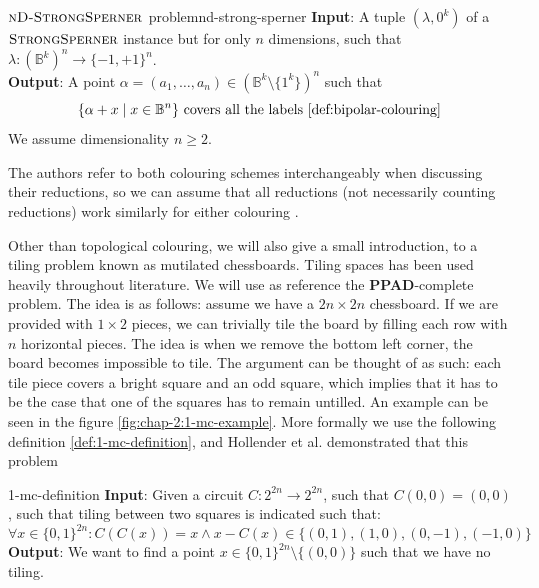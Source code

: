 \begin{definitionbox}{$\textnormal{\textsc{nD-StrongSperner}}$ problem}{nd-strong-sperner}
    \textbf{Input}: A tuple $(\lambda,0^k)$ of a $\textnormal{\textsc{StrongSperner}}$ instance but for only $n$ dimensions, such that
    $\lambda : (\mathbb{B}^k)^n \to \{-1, +1\}^n$.\\
    \textbf{Output}: A point $\alpha = (a_1, \hdots, a_n) \in (\mathbb{B}^k \setminus \{1^k\})^n$ such that
    $$
        \{\alpha + x \mid x \in \mathbb{B}^n\} \text{ covers all the labels \ref{def:bipolar-colouring}}
    $$
    We assume dimensionality $n \geq 2$.
\end{definitionbox}

The authors refer to both colouring schemes interchangeably when discussing their reductions,
so we can assume that all reductions (not necessarily counting reductions) work similarly for either colouring
\cite{chen_SettlingComplexityComputing_2009, deligkas_PureCircuitTightInapproximability_2024, daskalakis_ComplexityComputingNash_2006, chen_Complexity2DDiscrete_2009}.

Other than topological colouring, we will also give a small introduction, to a tiling problem known as mutilated chessboards. Tiling
spaces has been used heavily throughout literature. %
We will use as reference the \textbf{PPAD}-complete  problem. The idea is as follows:
assume we have a $2n \times 2n$ chessboard. If we are provided with $1 \times 2$ pieces, we can trivially tile the board by filling each row with $n$ horizontal
pieces. The idea is when we remove the bottom left corner, the board becomes impossible to tile. The argument
can be thought of as such: each tile piece covers a bright square and an odd square, which implies that it has to be the case that one of the squares
has to remain untilled. An example can be seen in the figure \ref{fig:chap-2:1-mc-example}. More formally we use the following definition \ref{def:1-mc-definition},
and Hollender et al. \cite{hollender_ComplexityMultisourceVariants_2018} demonstrated that this problem 



\begin{definitionbox}{ \cite{hollender_ComplexityMultisourceVariants_2018}}{1-mc-definition}
    \label{def:1-mc-definition}
    \textbf{Input}: Given a circuit $C : 2^{2n} \to 2^{2n}$, such that $C(0,0) = (0,0)$, such that tiling between two
    squares is indicated such that:
    $$
        \forall x \in \{0,1\}^{2n} : C(C(x)) = x \wedge x - C(x) \in \{(0,1), (1,0), (0, -1), (-1, 0 )\}
    $$
    \textbf{Output}: We want to find a point $x \in \{0,1\}^{2n} \setminus \{(0,0)\}$ such that we have no tiling.
\end{definitionbox}

